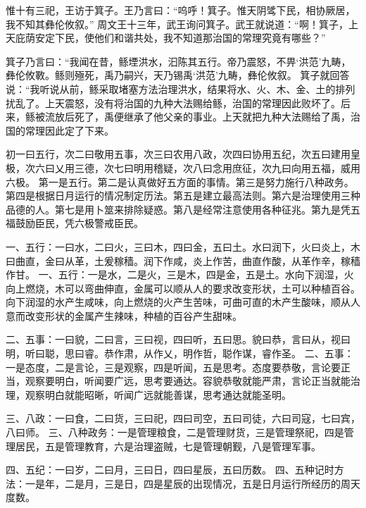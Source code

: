 \documentclass[12pt,UTF8]{ctexbook}
\begin{document}
惟十有三祀，王访于箕子。王乃言曰：“呜呼！箕子。惟天阴骘下民，相协厥居，我不知其彝伦攸叙。”
周文王十三年，武王询问箕子。武王就说道：“啊！箕子，上天庇荫安定下民，使他们和谐共处，我不知道那治国的常理究竟有哪些？”

箕子乃言曰：“我闻在昔，鲧堙洪水，汩陈其五行。帝乃震怒，不畀‘洪范’九畴，彝伦攸斁。鲧则殛死，禹乃嗣兴，天乃锡禹‘洪范’九畴，彝伦攸叙。
箕子就回答说：“我听说从前，鲧采取堵塞方法治理洪水，结果将水、火、木、金、土的排列扰乱了。上天震怒，没有将治国的九种大法赐给鲧，治国的常理因此败坏了。后来，鲧被流放后死了，禹便继承了他父亲的事业。上天就把九种大法赐给了禹，治国的常理因此定了下来。

初一曰五行，次二曰敬用五事，次三曰农用八政，次四曰协用五纪，次五曰建用皇极，次六曰乂用三德，次七曰明用稽疑，次八曰念用庶征，次九曰向用五福，威用六极。
第一是五行。第二是认真做好五方面的事情。第三是努力施行八种政务。第四是根据日月运行的情况制定历法。第五是建立最高法则。第六是治理使用三种品德的人。第七是用卜筮来排除疑惑。第八是经常注意使用各种征兆。第九是凭五福鼓励臣民，凭六极警戒臣民。

一、五行：一曰水，二曰火，三曰木，四曰金，五曰土。水曰润下，火曰炎上，木曰曲直，金曰从革，土爰稼穑。润下作咸，炎上作苦，曲直作酸，从革作辛，稼穑作甘。
一、五行：一是水，二是火，三是木，四是金，五是土。水向下润湿，火向上燃烧，木可以弯曲伸直，金属可以顺从人的要求改变形状，土可以种植百谷。向下润湿的水产生咸味，向上燃烧的火产生苦味，可曲可直的木产生酸味，顺从人意而改变形状的金属产生辣味，种植的百谷产生甜味。

二、五事：一曰貌，二曰言，三曰视，四曰听，五曰思。貌曰恭，言曰从，视曰明，听曰聪，思曰睿。恭作肃，从作乂，明作哲，聪作谋，睿作圣。
二、五事：一是态度，二是言论，三是观察，四是听闻，五是思考。态度要恭敬，言论要正当，观察要明白，听闻要广远，思考要通达。容貌恭敬就能严肃，言论正当就能治理，观察明白就能昭晰，听闻广远就能善谋，思考通达就能圣明。

三、八政：一曰食，二曰货，三曰祀，四曰司空，五曰司徒，六曰司寇，七曰宾，八曰师。
三、八种政务：一是管理粮食，二是管理财货，三是管理祭祀，四是管理居民，五是管理教育，六是治理盗贼，七是管理朝觐，八是管理军事。

四、五纪：一曰岁，二曰月，三曰日，四曰星辰，五曰历数。
四、五种记时方法：一是年，二是月，三是日，四是星辰的出现情况，五是日月运行所经历的周天度数。
\end{document}
